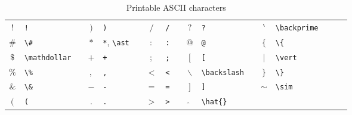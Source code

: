 \documentclass[captions=tableheading]{scrartcl}
\begin{document}
\begin{table}
  \caption{Printable \textsc{ASCII} characters}
  \label{tab:ascii}
  \centering
  \begin{tabular}[c]{clp{1pt}clp{1pt}clp{1pt}clp{1pt}clp{1pt}cl}
    \toprule
    $!$ & \verb|!| & & $)$ & \verb|)| & & $/$ & \verb|/| & &
    $?$ & \verb|?| & & $\backprime$ & \verb|\backprime| \\
    $\#$ & \verb|\#| & & $*$ & \verb|*|, \verb|\ast| & &
    $:$ & \verb|:| & & $@$ & \verb|@| & & $\{$ & \verb|\{| \\
    $\mathdollar$ & \verb|\mathdollar| & & $+$ & \verb|+| & &
    $;$ & \verb|;| & & $[$ & \verb|[| & & $\vert$ & \verb|\vert| \\
    $\%$ & \verb|\%| & & $,$ & \verb|,| & & $<$ & \verb|<| & &
    $\backslash$ & \verb|\backslash| & & $\}$ & \verb|\}| \\
    $\&$ & \verb|\&| & & $-$ & \verb|-| & & $=$ & \verb|=| & &
    $]$ & \verb|]| & & $\sim$ & \verb|\sim| \\
    $($ & \verb|(| & & $.$ & \verb|.| & & $>$ & \verb|>| & &
    $\hat{}$ & \verb|\hat{}| & & & \\
    \bottomrule
  \end{tabular}
\end{table}
\end{document}
